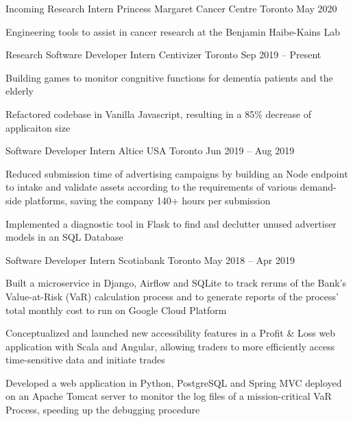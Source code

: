 \begin{cventries}
  \cventry
    {Incoming Research Intern}
    {Princess Margaret Cancer Centre}
    {Toronto}
    {May 2020}
    {}
    {
      \begin{cvitems}
        \item {Engineering tools to assist in cancer research at the Benjamin Haibe-Kains Lab}
      \end{cvitems}
    }
  \cventry
    {Research Software Developer Intern}
    {Centivizer}
    {Toronto}
    {Sep 2019 -- Present}
    {}
    {
      \begin{cvitems}
        \item {Building games to monitor congnitive functions for dementia patients and the elderly}
        \item {Refactored codebase in Vanilla Javascript, resulting in a 85\% decrease of applicaiton size}
      \end{cvitems}
    }
  \cventry
    {Software Developer Intern}
    {Altice USA}
    {Toronto}
    {Jun 2019 -- Aug 2019}
    {}
    {
    \begin{cvitems}
      \item {Reduced submission time of advertising campaigns by building an Node endpoint to intake and validate assets according to the requirements of various demand-side platforms, saving the company 140+ hours per submission}
      \item {Implemented a diagnostic tool in Flask to find and declutter unused advertiser models in an SQL Database}
    \end{cvitems}
    }
  \cventry
    {Software Developer Intern}
    {Scotiabank}
    {Toronto}
    {May 2018 -- Apr 2019}
    {}
    {
      \begin{cvitems}
        \item {Built a microservice in Django, Airflow and SQLite to track reruns of the Bank's Value-at-Risk (VaR) calculation process and to generate reports of the process' total monthly cost to run on Google Cloud Platform}
        \item {Conceptualized and launched new accessibility features in a Profit \& Loss web application with Scala and Angular, allowing traders to more efficiently access time-sensitive data and initiate trades}
        \item {Developed a web application in Python, PostgreSQL and Spring MVC deployed on an Apache Tomcat server to monitor the log files of a mission-critical VaR Process, speeding up the debugging procedure}
      \end{cvitems}
    }


\end{cventries}
